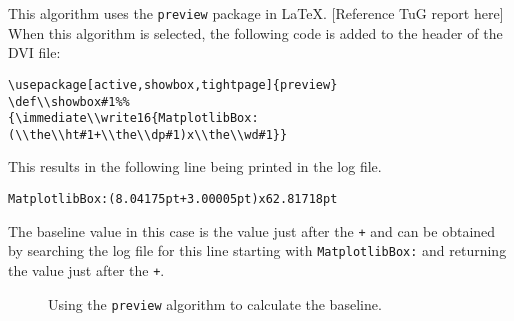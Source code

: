 \documentclass[]{article}
\begin{document}
This algorithm uses the \texttt{preview} package in \LaTeX{}.
{[}Reference TuG report here{]} When this algorithm is selected, the
following code is added to the header of the DVI file:

\begin{verbatim}
\usepackage[active,showbox,tightpage]{preview}
\def\\showbox#1%%
{\immediate\\write16{MatplotlibBox:(\\the\\ht#1+\\the\\dp#1)x\\the\\wd#1}}
\end{verbatim}

This results in the following line being printed in the log file.

\begin{verbatim}
MatplotlibBox:(8.04175pt+3.00005pt)x62.81718pt
\end{verbatim}

The baseline value in this case is the value just after the \texttt{+}
and can be obtained by searching the log file for this line starting
with \texttt{MatplotlibBox:} and returning the value just after the
\texttt{+}.

\begin{figure}
\begin{adjustwidth}{0.5in}{0in}
 \vspace{0.3cm}
 \vspace{0.3cm}
 \vspace{0.3cm}
 \vspace{0.3cm}
 \vspace{0.3cm}
 \vspace{0.3cm}
 \vspace{0.3cm}
 \vspace{0.3cm}
 \vspace{0.3cm}
 \vspace{0.3cm}
 \vspace{0.3cm}
 \vspace{0.3cm}
 \end{adjustwidth}
\caption{Using the \texttt{preview} algorithm to calculate the baseline.}
\end{figure}
\end{document}
